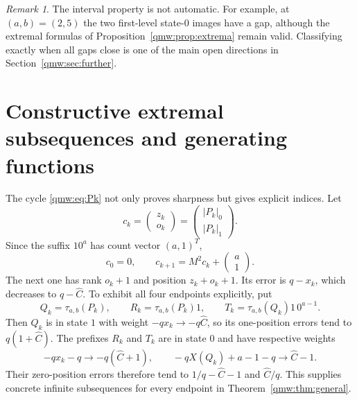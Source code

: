 \documentclass[11pt]{article}
\numberwithin{equation}{section}
\theoremstyle{definition}
\theoremstyle{remark}
\newtheorem{remark}[theorem]{Remark}
\newcommand{\ones}[1]{\lvert#1\rvert_1}
\newcommand{\zeros}[1]{\lvert#1\rvert_0}
\begin{document}
\begin{remark}
The interval property is not automatic.  For example, at $(a,b)=(2,5)$ the
two first-level state-$0$ images have a gap, although the extremal formulas
of Proposition~\ref{qmw:prop:extrema} remain valid.  Classifying exactly when all
gaps close is one of the main open directions in Section~\ref{qmw:sec:further}.
\end{remark}

\section{Constructive extremal subsequences and generating functions}
\label{qmw:sec:constructive}

The cycle \eqref{qmw:eq:Pk} not only proves sharpness but gives explicit indices.
Let
\begin{equation}\label{qmw:eq:countvector}
c_k=\begin{pmatrix}z_k\\o_k\end{pmatrix}
=\begin{pmatrix}\zeros{P_k}\\\ones{P_k}\end{pmatrix}.
\end{equation}
Since the suffix $10^a$ has count vector $(a,1)^T$,
\begin{equation}\label{qmw:eq:vectorrec}
c_0=0,
\qquad
c_{k+1}=M^2c_k+\begin{pmatrix}a\\1\end{pmatrix}.
\end{equation}
The next one has rank $o_k+1$ and position $z_k+o_k+1$.  Its error is
$q-x_k$, which decreases to $q-{\widehat C}$.  To exhibit all four endpoints explicitly,
put
\[
 Q_k=\tau_{a,b}(P_k),\qquad
 R_k=\tau_{a,b}(P_k)1,\qquad
 T_k=\tau_{a,b}(Q_k)1\,0^{a-1}.
\]
Then $Q_k$ is in state $1$ with weight $-qx_k\to-q{\widehat C}$, so its one-position
errors tend to $q(1+{\widehat C})$.  The prefixes $R_k$ and $T_k$ are in state $0$ and
have respective weights
\[
 -qx_k-q\longrightarrow-q({\widehat C}+1),
 \qquad
 -qX(Q_k)+a-1-q\longrightarrow {\widehat C}-1.
\]
Their zero-position errors therefore tend to $1/q-{\widehat C}-1$ and ${\widehat C}/q$.
This supplies concrete infinite subsequences for every endpoint in
Theorem~\ref{qmw:thm:general}.
\end{document}
